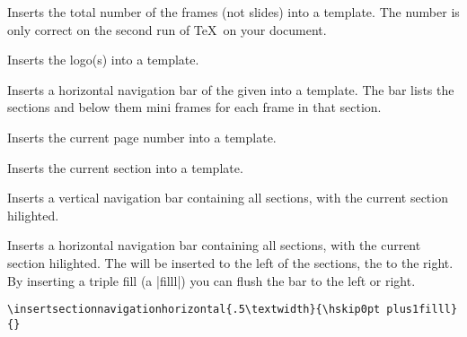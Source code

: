 \begin{command}{\inserttotalframenumber}
  Inserts the total number of the frames (not slides) into a
  template. The number is only correct on the second run of \TeX\ on
  your document.
\end{command}

\begin{command}{\insertlogo}
  Inserts the logo(s) into a template.
\end{command}

\begin{command}{\insertnavigation{}}
  Inserts a horizontal navigation bar of the given  into a
  template. The bar lists the sections and below them mini frames for
  each frame in that section.
\end{command}

\begin{command}{\insertpagenumber}
  Inserts the current page number into a template.
\end{command}

\begin{command}{\insertsection}
  Inserts the current section into a template.
\end{command}

\begin{command}{\insertsectionnavigation{}}
  Inserts a vertical navigation bar containing all sections, with the
  current section hilighted.
\end{command}

\begin{command}{\insertsectionnavigationhorizontal{}%
    }
  Inserts a horizontal navigation bar containing all sections, with
  the current section hilighted. The  will be
  inserted to the left of the sections, the  to the
  right. By inserting a triple fill (a
  |filll|) you can flush the bar to the left or right.
  \example
\begin{verbatim}
\insertsectionnavigationhorizontal{.5\textwidth}{\hskip0pt plus1filll}{}
\end{verbatim}
\end{command}

